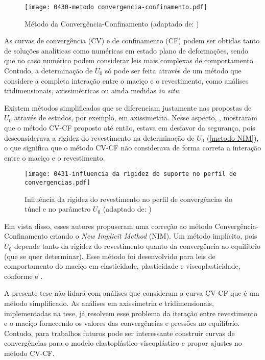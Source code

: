 \begin{figure}[H]
	\begin{center}
		\texttt{[image: 0430-metodo convergencia-confinamento.pdf]}
	\end{center}
	\caption{\label{metodo cv-cf}Método da Convergência-Confinamento (adaptado de: )}
\end{figure}

As curvas de convergência (CV) e de confinamento (CF) podem ser obtidas tanto de soluções analíticas como numéricas em estado plano de deformações, sendo que no caso numérico podem considerar leis mais complexas de comportamento. Contudo, a determinação de $U_0$ só pode ser feita através de um método que considere a completa interação entre o maciço e o revestimento, como análises tridimensionais, axissimétricas ou ainda medidas \textit{in situ}.

Existem métodos simplificados que se diferenciam justamente nas propostas de $U_0$ através de estudos, por exemplo, em axissimetria. Nesse aspecto, , mostraram que o método CV-CF proposto até então, estava em desfavor da segurança, pois desconsiderava a rigidez do revestimento na determinação de $U_0$   (\autoref{metodo NIM}), o que significa que o método CV-CF não considerava de forma correta a interação entre o maciço e o revestimento.

\begin{figure}[H]
	\begin{center}
		\texttt{[image: 0431-influencia da rigidez do suporte no perfil de convergencias.pdf]}
	\end{center}
	\caption{\label{metodo NIM}Influência da rigidez do revestimento no perfil de convergências do túnel e no parâmetro $U_0$ (adaptado de: )}
\end{figure}

Em vista disso, esses autores propuseram uma correção ao método Convergência-Confinamento criando o \textit{New Implicit Method} (NIM). Um método implícito, pois $U_0$ depende tanto da rigidez do revestimento quanto da convergência ao equilíbrio (que se quer determinar). Esse método foi desenvolvido para leis de comportamento do maciço em elasticidade, plasticidade e viscoplasticidade, conforme  e .

A presente tese não lidará com análises que consideram a curva CV-CF que é um método simplificado. As análises em axissimetria e tridimensionais, implementadas na tese, já resolvem esse problema da iteração entre revestimento e o maciço fornecendo os valores das convergências e pressões no equilíbrio. Contudo, para trabalhos futuros pode ser interessante construir curvas de convergências para o modelo elastoplástico-viscoplástico e propor ajustes no método CV-CF.